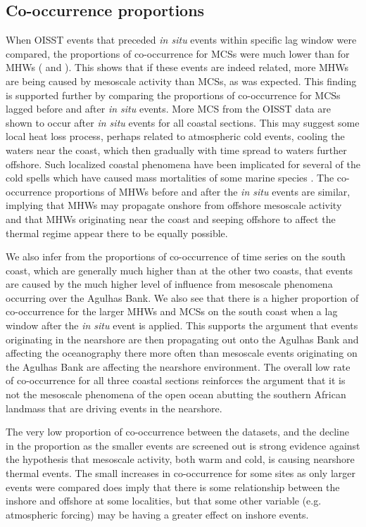 \documentclass[a4paper,10pt,review]{elsarticle}
\begin{document}
\subsection{Co-occurrence proportions}
When OISST events that preceded \emph{in situ} events within specific lag window were compared, the proportions of co-occurrence for MCSs were much lower than for MHWs ( and ). This shows that if these events are indeed related, more MHWs are being caused by mesoscale activity than MCSs, as was expected. This finding is supported further by comparing the proportions of co-occurrence for MCSs lagged before and after \emph{in situ} events. More MCS from the OISST data are shown to occur after \emph{in situ} events for all coastal sections. This may suggest some local heat loss process, perhaps related to atmospheric cold events, cooling the waters near the coast, which then gradually with time spread to waters further offshore. Such localized coastal phenomena have been implicated for several of the cold spells which have caused mass mortalities of some marine species \citep[e.g.][]{Gunter1941, Firth2011}. The co-occurrence proportions of MHWs before and after the \emph{in situ} events are similar, implying that MHWs may propagate onshore from offshore mesoscale activity and that MHWs originating near the coast and seeping offshore to affect the thermal regime appear there to be equally possible.

We also infer from the proportions of co-occurrence of time series on the south coast, which are generally much higher than at the other two coasts, that events are caused by the much higher level of influence from mesoscale phenomena occurring over the Agulhas Bank. We also see that there is a higher proportion of co-occurrence for the larger MHWs and MCSs on the south coast when a lag window after the \emph{in situ} event is applied. This supports the argument that events originating in the nearshore are then propagating out onto the Agulhas Bank and affecting the oceanography there more often than mesoscale events originating on the Agulhas Bank are affecting the nearshore environment. The overall low rate of co-occurrence for all three coastal sections reinforces the argument that it is not the mesoscale phenomena of the open ocean abutting the southern African landmass that are driving events in the nearshore.

The very low proportion of co-occurrence between the datasets, and the decline in the proportion as the smaller events are screened out is strong evidence against the hypothesis that mesoscale activity, both warm and cold, is causing nearshore thermal events. The small increases in co-occurrence for some sites as only larger events were compared does imply that there is some relationship between the inshore and offshore at some localities, but that some other variable (e.g. atmospheric forcing) may be having a greater effect on inshore events.
\end{document}
